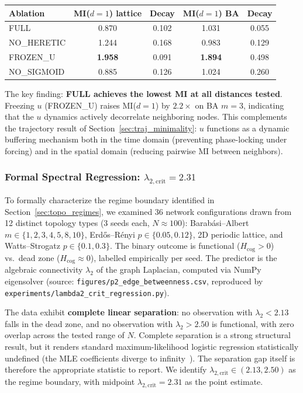 \documentclass[11pt]{article}
\begin{document}
\begin{center}
\begin{tabular}{lcccc}
\toprule
Ablation & MI($d=1$) lattice & Decay & MI($d=1$) BA & Decay \\
\midrule
FULL       & 0.870 & 0.102 & 1.031 & 0.055 \\
NO\_HERETIC & 1.244 & 0.168 & 0.983 & 0.129 \\
FROZEN\_U  & \textbf{1.958} & 0.091 & \textbf{1.894} & 0.498 \\
NO\_SIGMOID & 0.885 & 0.126 & 1.024 & 0.260 \\
\bottomrule
\end{tabular}
\end{center}

The key finding: \textbf{FULL achieves the lowest MI at all distances tested}. Freezing $u$ (FROZEN\_U) raises MI($d=1$) by $2.2\times$ on BA $m=3$, indicating that the $u$ dynamics actively decorrelate neighboring nodes. This complements the trajectory result of Section~\ref{sec:traj_minimality}: $u$ functions as a dynamic buffering mechanism both in the time domain (preventing phase-locking under forcing) and in the spatial domain (reducing pairwise MI between neighbors).

\subsubsection*{Formal Spectral Regression: $\lambda_{2,\mathrm{crit}} = 2.31$}
\label{sec:lambda2}

To formally characterize the regime boundary identified in Section~\ref{sec:topo_regimes}, we examined 36 network configurations drawn from 12 distinct topology types (3 seeds each, $N \approx 100$): Barab\'asi--Albert $m \in \{1, 2, 3, 4, 5, 8, 10\}$, Erd\H{o}s--R\'enyi $p \in \{0.05, 0.12\}$, 2D periodic lattice, and Watts--Strogatz $p \in \{0.1, 0.3\}$. The binary outcome is functional ($H_{\mathrm{cog}} > 0$) vs.\ dead zone ($H_{\mathrm{cog}} \approx 0$), labelled empirically per seed. The predictor is the algebraic connectivity $\lambda_2$ of the graph Laplacian, computed via NumPy eigensolver (source: \texttt{figures/p2\_edge\_betweenness.csv}, reproduced by \texttt{experiments/lambda2\_crit\_regression.py}).

The data exhibit \textbf{complete linear separation}: no observation with $\lambda_2 < 2.13$ falls in the dead zone, and no observation with $\lambda_2 > 2.50$ is functional, with zero overlap across the tested range of $N$. Complete separation is a strong structural result, but it renders standard maximum-likelihood logistic regression statistically undefined (the MLE coefficients diverge to infinity~\cite{albert1984}). The separation gap itself is therefore the appropriate statistic to report. We identify $\lambda_{2,\mathrm{crit}} \in (2.13, 2.50)$ as the regime boundary, with midpoint $\lambda_{2,\mathrm{crit}} = 2.31$ as the point estimate.
\end{document}

